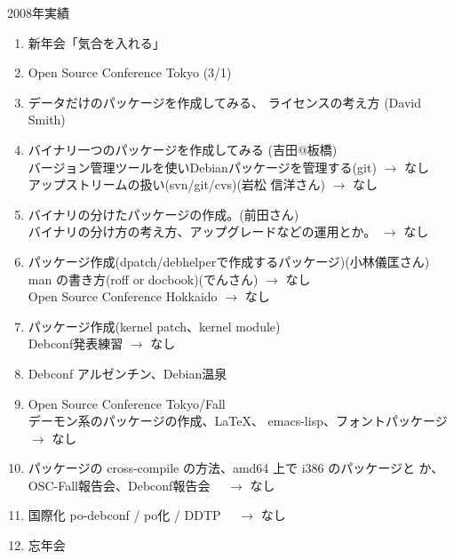 \begin{frame}{2008年実績}

{\scriptsize
\begin{enumerate}
 \item 新年会「気合を入れる」
 \item Open Source Conference Tokyo (3/1)
 \item データだけのパッケージを作成してみる、
       ライセンスの考え方 (David Smith)
 \item バイナリ一つのパッケージを作成してみる (吉田@板橋)\\
       バージョン管理ツールを使いDebianパッケージを管理する(git)
       $\rightarrow$  なし\\
       アップストリームの扱い(svn/git/cvs)(岩松 信洋さん)
       $\rightarrow$  なし
 \item バイナリの分けたパッケージの作成。(前田さん)\\
       バイナリの分け方の考え方、アップグレードなどの運用とか。       $\rightarrow$  なし
 \item パッケージ作成(dpatch/debhelperで作成するパッケージ)(小林儀匡さん)\\
       man の書き方(roff or docbook)(でんさん) $\rightarrow$  なし\\
       Open Source Conference Hokkaido $\rightarrow$  なし
 \item パッケージ作成(kernel patch、kernel module)\\
       Debconf発表練習 $\rightarrow$  なし
 \item Debconf アルゼンチン、Debian温泉
 \item Open Source Conference Tokyo/Fall\\
       デーモン系のパッケージの作成、\LaTeX{}、 emacs-lisp、フォントパッケージ
       $\rightarrow$  なし
 \item パッケージの cross-compile の方法、amd64 上で i386 のパッケージと
       か、OSC-Fall報告会、Debconf報告会　 $\rightarrow$  なし
 \item 国際化 po-debconf / po化 / DDTP　 $\rightarrow$  なし
 \item 忘年会
\end{enumerate}
}
\end{frame}



